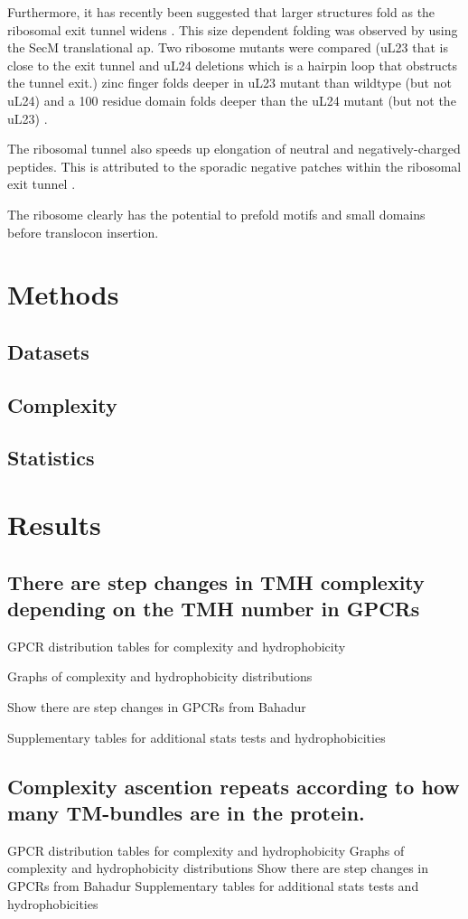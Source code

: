 Furthermore, it has recently been suggested that larger structures fold as the ribosomal exit tunnel widens \cite{Kudva2018}.
This size dependent folding was observed by using the SecM translational \gls{ap}.
Two ribosome mutants were compared (uL23 that is close to the exit tunnel and uL24 deletions which is a hairpin loop that obstructs the tunnel exit.) zinc finger folds deeper in uL23 mutant than wildtype (but not uL24) and a 100 residue domain folds deeper than the uL24 mutant (but not the uL23) \cite{Kudva2018}.

The ribosomal tunnel also speeds up elongation of neutral and negatively-charged peptides.
This is attributed to the sporadic negative patches within the ribosomal exit tunnel \cite{Lu2008}.

The ribosome clearly has the potential to prefold motifs and small domains before translocon insertion.

\section{Methods}
\subsection{Datasets}
\subsection{Complexity}
\subsection{Statistics}

\section{Results}
\subsection{There are step changes in TMH complexity depending on the TMH number in GPCRs}
GPCR distribution tables for complexity and hydrophobicity

Graphs of complexity and hydrophobicity distributions

Show there are step changes in GPCRs from Bahadur

Supplementary tables for additional stats tests and hydrophobicities

\subsection{Complexity ascention repeats according to how many TM-bundles are in the protein.}
GPCR distribution tables for complexity and hydrophobicity
Graphs of complexity and hydrophobicity distributions
Show there are step changes in GPCRs from Bahadur
Supplementary tables for additional stats tests and hydrophobicities

